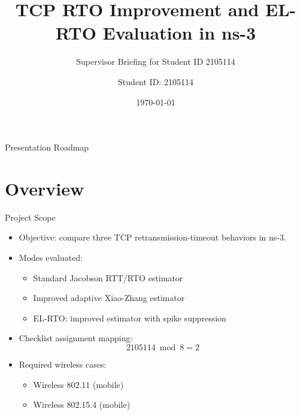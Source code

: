 \documentclass[aspectratio=169]{beamer}
\title{TCP RTO Improvement and EL-RTO Evaluation in ns-3}
\subtitle{Supervisor Briefing for Student ID 2105114}
\author{Student ID: 2105114}
\date{\today}
\begin{document}
\begin{frame}
  \titlepage
\end{frame}

\begin{frame}{Presentation Roadmap}
  \tableofcontents
\end{frame}

\section{Overview}
\begin{frame}{Project Scope}
  \begin{itemize}
    \item Objective: compare three TCP retransmission-timeout behaviors in ns-3.
    \item Modes evaluated:
    \begin{itemize}
      \item Standard Jacobson RTT/RTO estimator
      \item Improved adaptive Xiao-Zhang estimator
      \item EL-RTO: improved estimator with spike suppression
    \end{itemize}
    \item Checklist assignment mapping:
    \[
      2105114 \bmod 8 = 2
    \]
    \item Required wireless cases:
    \begin{itemize}
      \item Wireless 802.11 (mobile)
      \item Wireless 802.15.4 (mobile)
    \end{itemize}
  \end{itemize}
\end{frame}
\end{document}
